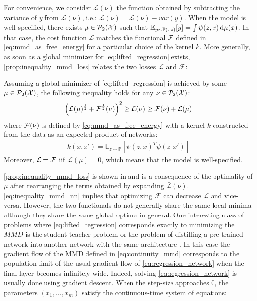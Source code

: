 For convenience, we consider $\bar{\mathcal{L}}(\nu)$ the function obtained by subtracting the variance of $y$ from $\mathcal{L}(\nu)$, i.e.: $\bar{\mathcal{L}}(\nu) = \mathcal{L}(\nu) - var(y) $. When the model is well specified, there exists $\mu \in \mathcal{P}_2({{\mathcal X}}) $ such that $\mathbb{E}_{y\sim \mathbb{P}(.|z)}[y] =  \int \psi(z,x) \mathop{}\!\mathrm{d} \mu(x)$. In that case, the cost function $\bar{\mathcal{L}}$ matches  the functional ${{\mathcal F}}$ defined in \cref{eq:mmd_as_free_energy}  for a particular choice of the kernel $k$. More generally, as soon as a global minimizer for  \cref{eq:lifted_regression} exists,  \cref{prop:inequality_mmd_loss} relates the two losses $\bar{\mathcal{L}}$ and $\mathcal{F}$:
\begin{proposition}\label{prop:inequality_mmd_loss}
	Assuming a global minimizer of \cref{eq:lifted_regression} is achieved by some $\mu\in \mathcal{P}_2({{\mathcal X}})$, the following inequality holds for any $\nu \in \mathcal{P}_2({{\mathcal X}})$:
	\begin{align}\label{eq:inequality_mmd_nn}
		\left(\bar{\mathcal{L}}(\mu)^{\frac{1}{2}} + {{\mathcal F}}^{\frac{1}{2}}(\nu)\right)^2
		\geq 
		\bar{\mathcal{L}}(\nu)
		\geq
		\mathcal{F}(\nu) + \bar{\mathcal{L}}(\mu)
	\end{align}
	where ${{\mathcal F}}(\nu)$ is defined by \cref{eq:mmd_as_free_energy} with  a kernel $k$  constructed from the data as an expected product of networks:
\begin{align}
	k(x,x') = \mathbb{E}_{z\sim \mathbb{P}} [\psi(z,x)^T\psi(z,x')]
\end{align}
Moreover, $\bar{\mathcal{L}} = {{\mathcal F}}$ iif $\bar{\mathcal{L}}(\mu)=0$, which means that the model is well-specified. 
\end{proposition}
\cref{prop:inequality_mmd_loss} is shown in  and is a consequence of the optimality of $\mu$ after rearranging the terms obtained by expanding $\bar{\mathcal{L}}(\nu)$.
 \cref{eq:inequality_mmd_nn} implies that optimizing $\mathcal{F}$ can decrease  $\bar{\mathcal{L}}$ and vice-versa. However, the two functionals do not generally share the same local minima although they share the same global optima in general. One interesting class of problems where \cref{eq:lifted_regression} corresponds exactly to minimizing the $MMD$ is the student-teacher problem or the problem of distilling a pre-trained network into another network with the same architecture . In this case the gradient flow of the MMD defined in \cref{eq:continuity_mmd} corresponds to the population limit of the usual gradient flow of \cref{eq:regression_network} when the final layer becomes infinitely wide. Indeed, solving \cref{eq:regression_network} is usually done using gradient descent. When the step-size approaches $0$, the parameters $(x_1,...,x_m)$ satisfy the continuous-time system of equations:
